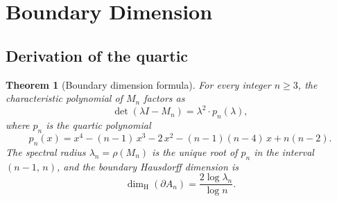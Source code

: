 \documentclass{amsart}
\newtheorem{theorem}{Theorem}[section]
\theoremstyle{definition}
\theoremstyle{remark}
\newcommand{\dH}{\dim_{\mathrm{H}}}
\begin{document}
\section{Boundary Dimension}
\label{sec:dim}

\subsection{Derivation of the quartic}

\begin{theorem}[Boundary dimension formula]\label{thm:dim}
For every integer $n \ge 3$, the characteristic polynomial of $M_n$
factors as
\begin{equation}\label{eq:charpoly-factor}
  \det(\lambda I - M_n) = \lambda^2 \cdot p_n(\lambda),
\end{equation}
where $p_n$ is the quartic polynomial
\begin{equation}\label{eq:quartic}
  p_n(x) = x^4 - (n{-}1)\,x^3 - 2\,x^2 - (n{-}1)(n{-}4)\,x + n(n{-}2).
\end{equation}
The spectral radius $\lambda_n = \rho(M_n)$ is the unique root of $p_n$
in the interval $(n{-}1,\, n)$, and the boundary Hausdorff dimension is
\begin{equation}\label{eq:dim}
  \dH(\partial A_n) = \frac{2\log\lambda_n}{\log n}.
\end{equation}
\end{theorem}
\end{document}
